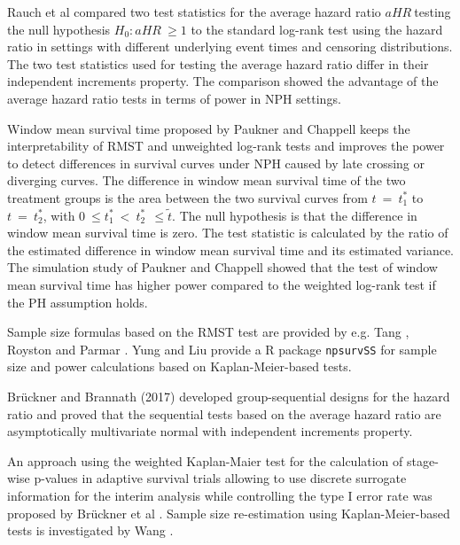 \noindent 

\noindent Rauch et al  \cite{Rauch.2018} compared two test statistics for the average hazard ratio $aHR\ $testing the null hypothesis $H_0:aHR\mathrm{\ }\ge 1$ to the standard log-rank test using the hazard ratio in settings with different underlying event times and censoring distributions. The two test statistics used for testing the average hazard ratio differ in their independent increments property. The comparison showed the advantage of the average hazard ratio tests in terms of power in NPH settings. 

\noindent Window mean survival time proposed by Paukner and Chappell  \cite{Paukner.2021} keeps the interpretability of RMST and unweighted log-rank tests and improves the power to detect differences in survival curves under NPH caused by late crossing or diverging curves. The difference in window mean survival time of the two treatment groups is the area between the two survival curves from $t\ =\ t^*_1$ to $t\ =\ t^*_2$, with $0\ \le t^*_1\ <\ t^*_2\ \ \le \tilde{t}$. The null hypothesis is that the difference in window mean survival time is zero. The test statistic is calculated by the ratio of the estimated difference in window mean survival time and its estimated variance. The simulation study of Paukner and Chappell \cite{Paukner.2021} showed that the test of window mean survival time has higher power compared to the weighted log-rank test if the PH assumption holds. 

\noindent 

\noindent Sample size formulas based on the RMST test are provided by e.g. Tang \cite{Tang.2022}, Royston and Parmar \cite{Royston.2013}. Yung and Liu \cite{Yung.2020} provide a R package \texttt{npsurvSS} for sample size and power calculations based on Kaplan-Meier-based tests.

\noindent 

\noindent Br\"{u}ckner and Brannath (2017) developed group-sequential designs for the hazard ratio and proved that the sequential tests based on the average hazard ratio are asymptotically multivariate normal with independent increments property.

\noindent An approach using the weighted Kaplan-Maier test for the calculation of stage-wise p-values in adaptive survival trials allowing to use discrete surrogate information for the interim analysis while controlling the type I error rate was proposed by Br\"{u}ckner et al \cite{Bruckner.2018}.  Sample size re-estimation using Kaplan-Meier-based tests is investigated by Wang \cite{Wang.2022}.

